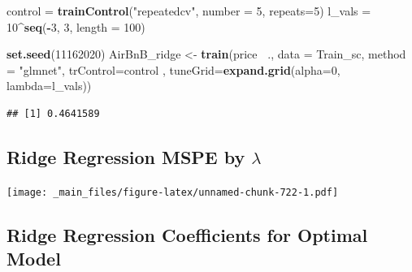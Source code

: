 \documentclass[]{book}
\newenvironment{Shaded}{\begin{snugshade}}{\end{snugshade}}
\newcommand{\KeywordTok}[1]{\textcolor[rgb]{0.13,0.29,0.53}{\textbf{#1}}}
\newcommand{\DataTypeTok}[1]{\textcolor[rgb]{0.13,0.29,0.53}{#1}}
\newcommand{\DecValTok}[1]{\textcolor[rgb]{0.00,0.00,0.81}{#1}}
\newcommand{\StringTok}[1]{\textcolor[rgb]{0.31,0.60,0.02}{#1}}
\newcommand{\OperatorTok}[1]{\textcolor[rgb]{0.81,0.36,0.00}{\textbf{#1}}}
\newcommand{\NormalTok}[1]{#1}
\begin{document}
\begin{Shaded}
\begin{Highlighting}[]
\NormalTok{control =}\StringTok{ }\KeywordTok{trainControl}\NormalTok{(}\StringTok{"repeatedcv"}\NormalTok{, }\DataTypeTok{number =} \DecValTok{5}\NormalTok{, }\DataTypeTok{repeats=}\DecValTok{5}\NormalTok{)}
\NormalTok{l_vals =}\StringTok{ }\DecValTok{10}\OperatorTok{^}\KeywordTok{seq}\NormalTok{(}\OperatorTok{-}\DecValTok{3}\NormalTok{, }\DecValTok{3}\NormalTok{, }\DataTypeTok{length =} \DecValTok{100}\NormalTok{)}

\KeywordTok{set.seed}\NormalTok{(}\DecValTok{11162020}\NormalTok{)}
\NormalTok{AirBnB_ridge <-}\StringTok{ }\KeywordTok{train}\NormalTok{(price }\OperatorTok{~}\NormalTok{., }\DataTypeTok{data =}\NormalTok{ Train_sc, }\DataTypeTok{method =} \StringTok{"glmnet"}\NormalTok{, }\DataTypeTok{trControl=}\NormalTok{control , }
                      \DataTypeTok{tuneGrid=}\KeywordTok{expand.grid}\NormalTok{(}\DataTypeTok{alpha=}\DecValTok{0}\NormalTok{, }\DataTypeTok{lambda=}\NormalTok{l_vals))}
\end{Highlighting}
\end{Shaded}

\begin{Shaded}
\end{Shaded}

\begin{verbatim}
## [1] 0.4641589
\end{verbatim}

\subsection{\texorpdfstring{Ridge Regression MSPE by
\(\lambda\)}{Ridge Regression MSPE by \textbackslash{}lambda}}\label{ridge-regression-mspe-by-lambda}

\texttt{[image: \_main\_files/figure-latex/unnamed-chunk-722-1.pdf]}

\subsection{Ridge Regression Coefficients for Optimal
Model}\label{ridge-regression-coefficients-for-optimal-model}

\begin{Shaded}
\end{Shaded}
\end{document}
